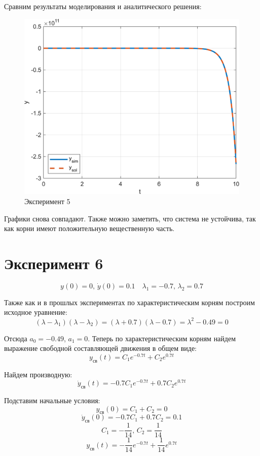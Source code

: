 Сравним результаты моделирования и аналитического решения:
\begin{figure}[H]
    \centering
    \includegraphics[width=1\textwidth, trim={0cm 0cm 0cm 0cm}]{../images/1_5.png}
    \caption{Эксперимент 5}
    \label{fig:exp5}
\end{figure}

Графики снова совпадают. Также можно заметить, что система не устойчива, так как корни имеют положительную вещественную часть.
\section{Эксперимент 6}
\[y(0) = 0,\, \dot y(0) = 0.1 \quad \lambda_1 = -0.7,\, \lambda_2 = 0.7\]

Также как и в прошлых экспериментах по характеристическим корням построим исходное уравнение:
\[(\lambda - \lambda_1)(\lambda - \lambda_2) = (\lambda + 0.7)(\lambda - 0.7) = \lambda^2 - 0.49 = 0\]

Отсюда $a_0 = -0.49$, $a_1 = 0$. Теперь по характеристическим корням найдем выражение свободной составляющей движения в общем виде:
\[y_{\text{св}}(t) = C_1 e^{-0.7 t} + C_2 e^{0.7 t}\]

Найдем производную:
\[\dot y_{\text{св}}(t) = -0.7C_1 e^{-0.7 t} + 0.7C_2 e^{0.7 t}\]

Подставим начальные условия:
\[y_{\text{св}}(0) = C_1 + C_2 = 0\]
\[\dot y_{\text{св}}(0) = -0.7C_1 + 0.7C_2 = 0.1\]
\[C_1 = -\frac{1}{14},\, C_2 = \frac{1}{14}\]
\[y_{\text{св}}(t) = -\frac{1}{14} e^{-0.7 t} + \frac{1}{14} e^{0.7 t}\]

